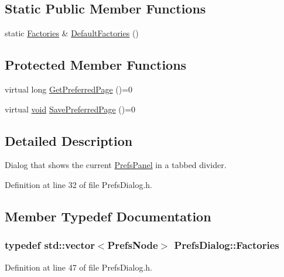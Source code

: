 \subsection*{Static Public Member Functions}
\begin{DoxyCompactItemize}
\item 
static \hyperlink{class_prefs_dialog_abce19159c638bc50c25147e479275388}{Factories} \& \hyperlink{class_prefs_dialog_ac42cda72337d03c90b4cd7951b8e0dcd}{Default\+Factories} ()
\end{DoxyCompactItemize}
\subsection*{Protected Member Functions}
\begin{DoxyCompactItemize}
\item 
virtual long \hyperlink{class_prefs_dialog_ab0e673675a568e2cffb6de8e30ea05eb}{Get\+Preferred\+Page} ()=0
\item 
virtual \hyperlink{sound_8c_ae35f5844602719cf66324f4de2a658b3}{void} \hyperlink{class_prefs_dialog_a92f3624065532733dc7d707be6ffbfcb}{Save\+Preferred\+Page} ()=0
\end{DoxyCompactItemize}


\subsection{Detailed Description}
Dialog that shows the current \hyperlink{class_prefs_panel}{Prefs\+Panel} in a tabbed divider. 

Definition at line 32 of file Prefs\+Dialog.\+h.



\subsection{Member Typedef Documentation}
\subsubsection[{\texorpdfstring{Factories}{Factories}}]{\setlength{\rightskip}{0pt plus 5cm}typedef std\+::vector$<${\bf Prefs\+Node}$>$ {\bf Prefs\+Dialog\+::\+Factories}}\hypertarget{class_prefs_dialog_abce19159c638bc50c25147e479275388}{}\label{class_prefs_dialog_abce19159c638bc50c25147e479275388}


Definition at line 47 of file Prefs\+Dialog.\+h.



